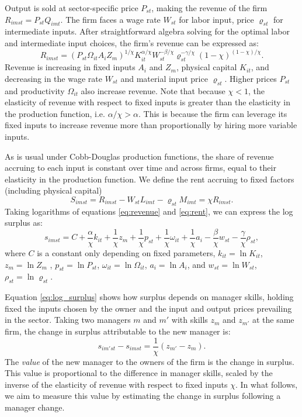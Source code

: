 \documentclass[11pt,a4paper]{article}
\begin{document}
Output is sold at sector-specific price $P_{st}$, making the revenue of the firm $R_{imst} = P_{st}Q_{imt}$. The firm faces a wage rate $W_{st}$ for labor input, price $\varrho_{st}$ for intermediate inputs. After straightforward algebra solving for the optimal labor and intermediate input choices, the firm's revenue can be expressed as:
\begin{equation}\label{eq:revenue}
R_{imst} = (P_{st}\Omega_{it}A_i Z_m)^{1/\chi}
K_{it}^{\alpha/\chi}
W_{st}^{-\beta/\chi}
\varrho_{st}^{-\gamma/\chi}
(1-\chi)^{(1-\chi)/\chi}.
\end{equation}
Revenue is increasing in fixed inputs $A_i$ and $Z_m$, physical capital $K_{it}$, and decreasing in the wage rate $W_{st}$ and material input price $\varrho_{st}$. Higher prices $P_{st}$ and productivity $\Omega_{it}$ also increase revenue. Note that because $\chi<1$, the elasticity of revenue with respect to fixed inputs is greater than the elasticity in the production function, i.e. $\alpha/\chi > \alpha$. This is because the firm can leverage its fixed inputs to increase revenue more than proportionally by hiring more variable inputs.

As is usual under Cobb-Douglas production functions, the share of revenue accruing to each input is constant over time and across firms, equal to their elasticity in the production function. We define the rent accruing to fixed factors (including physical capital) 
\begin{equation}\label{eq:rent}
S_{imst} = R_{imst} - W_{st}L_{imt} - \varrho_{st}M_{imt} = \chi R_{imst}.
\end{equation}
Taking logarithms of equations \eqref{eq:revenue} and \eqref{eq:rent}, we can express the log surplus as:      
\begin{equation}\label{eq:log_surplus}
s_{imst} = C+\frac\alpha\chi k_{it} + \frac1\chi {z}_{m} + \frac1\chi p_{st} + \frac1\chi{\omega}_{it}+\frac1\chi a_i 
- \frac\beta\chi w_{st} - \frac\gamma\chi \rho_{st},
\end{equation}
where $C$ is a constant only depending on fixed parameters, $k_{it} = \ln K_{it}$, ${z}_{m} = \ln Z_m$ , $ p_{st} = \ln P_{st}$, ${\omega}_{it} = \ln\Omega_{it}$, $a_i = \ln A_i$, and $w_{st} = \ln W_{st}$, $\rho_{st} = \ln \varrho_{st}$. 

Equation \eqref{eq:log_surplus} shows how surplus depends on manager skills, holding fixed the inputs chosen by the owner and the input and output prices prevailing in the sector. Taking two managers $m$ and $m'$ with skills ${z}_m$ and ${z}_{m'}$ at the same firm, the change in surplus attributable to the new manager is:
\begin{equation}\label{eq:manager_change}
s_{im'st} - s_{imst} = \frac1\chi({z}_{m'} - {z}_{m}).
\end{equation}
The \emph{value} of the new manager to the owners of the firm is the change in surplus. This value is proportional to the difference in manager skills, scaled by the inverse of the elasticity of revenue with respect to fixed inputs $\chi$. In what follows, we aim to measure this value by estimating the change in surplus following a manager change.
\end{document}
